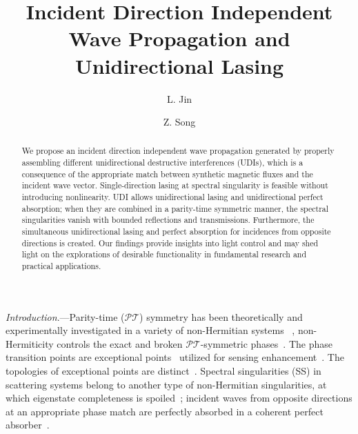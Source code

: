 \documentclass[prl,showpacs,superscriptaddress,twocolumn]{revtex4-1}
\begin{document}
\title{Incident Direction Independent Wave Propagation and Unidirectional
Lasing}
\author{L. Jin}
\author{Z. Song}

\begin{abstract}
We propose an incident direction independent wave propagation generated by
properly assembling different unidirectional destructive interferences
(UDIs), which is a consequence of the appropriate match between synthetic
magnetic fluxes and the incident wave vector. Single-direction lasing at
spectral singularity is feasible without introducing nonlinearity. UDI
allows unidirectional lasing and unidirectional perfect absorption; when
they are combined in a parity-time symmetric manner, the spectral
singularities vanish with bounded reflections and transmissions.
Furthermore, the simultaneous unidirectional lasing and perfect absorption
for incidences from opposite directions is created. Our findings provide
insights into light control and may shed light on the explorations of
desirable functionality in fundamental research and practical applications.
\end{abstract}

\maketitle

\emph{Introduction}.---Parity-time ($\mathcal{PT}$) symmetry has been
theoretically and experimentally investigated in a variety of non-Hermitian
systems~\cite%
{Bender98,Ali02,Jones,Ruschhaupt,El,Musslimani,Klaiman,LJIN09,ZLin,SRotter,VVK,HJing,LGePRX,ZhuPRX,Chang,Alu,AAS,AGuo,CE,BP,ZZhang,PTRev}%
, non-Hermiticity controls the exact and broken $\mathcal{PT}$-symmetric
phases~\cite{AGuo,CE,BP,ZZhang,PTRev}. The phase transition points are
exceptional points~\cite{Dembowski,Wunner,Rotter,Uzdin,Heiss12} utilized for
sensing enhancement~\cite{Wiersig,Wiersig2016,ZPLiu,EP2Sensing,EP3Sensing}.
The topologies of exceptional points are distinct~\cite%
{Zhen,Menke,Doppler,Xu,KDingPRX}. Spectral singularities (SS) in scattering
systems belong to another type of non-Hermitian singularities, at which
eigenstate completeness is spoiled~\cite{Ali,Ali13}; incident waves from
opposite directions at an appropriate phase match are perfectly absorbed in
a coherent perfect absorber~\cite%
{CPA,LonghiCPA,Chong11,Wan,Sun,Wong,HangCPA,LGePRA17,CPAREV}.
\end{document}
